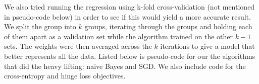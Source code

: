 \documentclass[11pt]{article}
\begin{document}
We also tried running the regression using k-fold cross-validation (not mentioned in pseudo-code below) in order to see if this would yield a more accurate result. We split the group into $k$ groups, iterating through the groups and holding each of them apart as a validation set while the algorithm trained on the other $k-1$ sets. The weights were then averaged across the $k$ iterations to give a model that better represents all the data. Listed below is pseudo-code for our the algorithms that did the heavy lifting: naive Bayes and SGD. We also include code for the cross-entropy and hinge loss objectives.

\begin{algorithmic}[1]
  \EndFor{}

  \EndProcedure{}
\end{algorithmic}

  \begin{algorithmic}[1]
    
    \EndIf{}
    \EndFor{}
    \EndProcedure{}
  \end{algorithmic}
  
  \begin{algorithmic}[1]
    \EndFor{}
    \EndProcedure{}
  \end{algorithmic}
    
\end{document}
